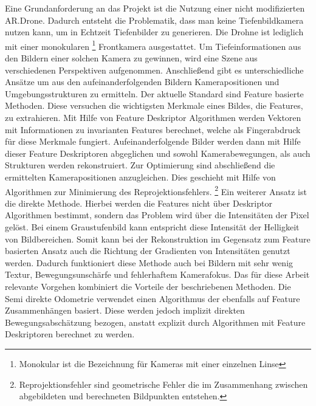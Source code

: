 Eine Grundanforderung an das Projekt ist die Nutzung einer nicht modifizierten AR.Drone. Dadurch entsteht die Problematik, dass man keine Tiefenbildkamera nutzen kann, um in Echtzeit Tiefenbilder zu generieren. Die Drohne ist lediglich mit einer monokularen \footnote{Monokular ist die Bezeichnung für Kameras mit einer einzelnen Linse} Frontkamera ausgestattet. \newline
Um Tiefeinformationen aus den Bildern einer solchen Kamera zu gewinnen, wird eine Szene aus verschiedenen Perspektiven aufgenommen. Anschließend gibt es unterschiedliche Ansätze um aus den aufeinanderfolgenden Bildern Kamerapositionen und Umgebungsstrukturen zu ermitteln. \newline
Der aktuelle Standard sind Feature basierte Methoden. Diese versuchen die wichtigsten Merkmale eines Bildes, die Features, zu extrahieren. Mit Hilfe von Feature Deskriptor Algorithmen werden Vektoren mit Informationen zu invarianten Features berechnet, welche als Fingerabdruck für diese Merkmale fungiert. \newline
Aufeinanderfolgende Bilder werden dann mit Hilfe dieser Feature Deskriptoren abgeglichen und sowohl Kamerabewegungen, als auch Strukturen werden rekonstruiert. Zur Optimierung sind abschließend die ermittelten Kamerapositionen anzugleichen. Dies geschieht mit Hilfe von Algorithmen zur Minimierung des Reprojektionsfehlers. \footnote{Reprojektionsfehler sind geometrische Fehler die im Zusammenhang zwischen abgebildeten und berechneten Bildpunkten entstehen.} 
\newline
Ein weiterer Ansatz ist die direkte Methode. Hierbei werden die Features nicht über Deskriptor Algorithmen bestimmt, sondern das Problem wird über die Intensitäten der Pixel gelöst. Bei einem Graustufenbild kann entspricht diese Intensität der Helligkeit von Bildbereichen. \newline
Somit kann bei der Rekonstruktion im Gegensatz zum Feature basierten Ansatz auch die Richtung der Gradienten von Intensitäten genutzt werden. Dadurch funktioniert diese Methode auch bei Bildern mit sehr wenig Textur, Bewegungsunschärfe und fehlerhaftem Kamerafokus. \newline
Das für diese Arbeit relevante Vorgehen kombiniert die Vorteile der beschriebenen Methoden. Die Semi direkte Odometrie %
verwendet einen Algorithmus der ebenfalls auf Feature Zusammenhängen basiert. Diese werden jedoch implizit direkten Bewegungsabschätzung bezogen, anstatt explizit durch Algorithmen mit Feature Deskriptoren berechnet zu werden. \newline
